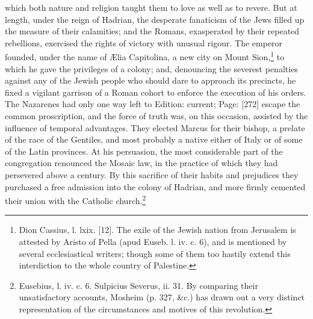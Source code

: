 which both nature and religion taught them to love as well as to revere. But at length, under the reign of Hadrian, the desperate fanaticism of the Jews filled up the measure of their calamities; and the Romans, exasperated by their repeated rebellions, exercised the rights of victory with unusual rigour. The emperor founded, under the name of Ælia Capitolina, a new city on Mount Sion,\footnote{Dion Cassius, l. lxix. [12]. The exile of the Jewish nation from Jerusalem is attested by Aristo of Pella (apud Euseb. l. iv. c. 6), and is mentioned by several ecclesiastical writers; though some of them too hastily extend this interdiction to the whole country of Palestine.} to which he gave the privileges of a colony; and, denouncing the severest penalties against any of the Jewish people who should dare to approach its precincts, he fixed a vigilant garrison of a Roman cohort to enforce the execution of his orders. The Nazarenes had only one way left to Edition: current; Page: [272] escape the common proscription, and the force of truth was, on this occasion, assisted by the influence of temporal advantages. They elected Marcus for their bishop, a prelate of the race of the Gentiles, and most probably a native either of Italy or of some of the Latin provinces. At his persuasion, the most considerable part of the congregation renounced the Mosaic law, in the practice of which they had persevered above a century. By this sacrifice of their habits and prejudices they purchased a free admission into the colony of Hadrian, and more firmly cemented their union with the Catholic church.\footnote{Eusebius, l. iv. c. 6. Sulpicius Severus, ii. 31. By comparing their unsatisfactory accounts, Mosheim (p. 327, \&c.) has drawn out a very distinct representation of the circumstances and motives of this revolution.}

